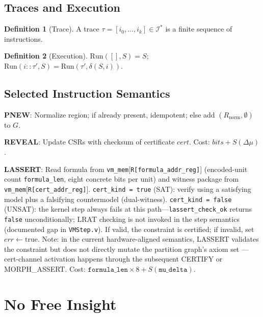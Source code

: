 \documentclass[11pt, a4paper]{report}
\theoremstyle{definition}
\newtheorem{definition}{Definition}[chapter]
\theoremstyle{plain}
\newcommand{\Ispace}{\mathcal{I}}
\begin{document}
\section{Traces and Execution}
\begin{definition}[Trace]
A trace $\tau = [i_0, \dots, i_k] \in \Ispace^*$ is a finite sequence of instructions.
\end{definition}

\begin{definition}[Execution]
$\mathrm{Run}([], S) = S$; \quad $\mathrm{Run}(i::\tau', S) = \mathrm{Run}(\tau', \delta(S,i))$.
\end{definition}

\section{Selected Instruction Semantics}

\textbf{PNEW}: Normalize region; if already present, idempotent; else add $(R_{\mathrm{norm}}, \emptyset)$ to $G$.

\textbf{REVEAL}: Update CSRs with checksum of certificate $\mathit{cert}$. Cost: $\mathit{bits} + S(\Delta\mu)$.

\textbf{LASSERT}: Read formula from \texttt{vm\_mem}[\texttt{R[formula\_addr\_reg]}] (encoded-unit count \texttt{formula\_len}, eight concrete bits per unit) and witness package from \texttt{vm\_mem}[\texttt{R[cert\_addr\_reg]}]. \texttt{cert\_kind = true} (SAT): verify using a satisfying model plus a falsifying countermodel (dual-witness). \texttt{cert\_kind = false} (UNSAT): the kernel step always fails at this path---\texttt{lassert\_check\_ok} returns \texttt{false} unconditionally; LRAT checking is not invoked in the step semantics (documented gap in \texttt{VMStep.v}). If valid, the constraint is certified; if invalid, set $\mathit{err} \gets \mathrm{true}$. Note: in the current hardware-aligned semantics, LASSERT validates the constraint but does not directly mutate the partition graph's axiom set --- cert-channel activation happens through the subsequent CERTIFY or MORPH\_ASSERT. Cost: $\mathtt{formula\_len} \times 8 + S(\mathtt{mu\_delta})$.


\chapter{No Free Insight}
\end{document}
